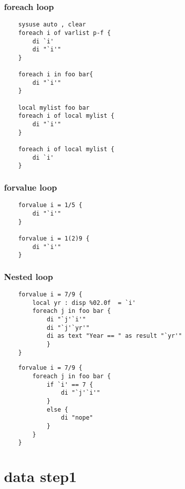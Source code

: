\documentclass[aspectratio=169,xcolor=dvipsnames,handout]{beamer}
\begin{document}
\begin{frame}
    \frametitle{foreach loop}
    \begin{verbatim}
    sysuse auto , clear
    foreach i of varlist p-f {
        di `i'
        di "`i'"
    }

    foreach i in foo bar{
        di "`i'"
    }

    local mylist foo bar
    foreach i of local mylist {
        di "`i'"
    }

    foreach i of local mylist {
        di `i'
    }
    \end{verbatim}
\end{frame}

\begin{frame}[fragile]
    \frametitle{forvalue loop}
    \begin{verbatim}
    forvalue i = 1/5 {
        di "`i'"
    }

    forvalue i = 1(2)9 {
        di "`i'"
    }
    \end{verbatim}
\end{frame}

\begin{frame}
    \frametitle{Nested loop}
    \begin{verbatim}
    forvalue i = 7/9 {
        local yr : disp %02.0f  = `i'
        foreach j in foo bar {
            di "`j'`i'"
            di "`j'`yr'"
            di as text "Year == " as result "`yr'"
            }
    }
    \end{verbatim}
\framebreak%
    \small
    \begin{verbatim}
    forvalue i = 7/9 {
        foreach j in foo bar {
            if `i' == 7 {
                di "`j'`i'"
            }
            else {
                di "nope"
            }
        }
    }
    \end{verbatim}
\end{frame}

\section{data step1}%
\end{document}
